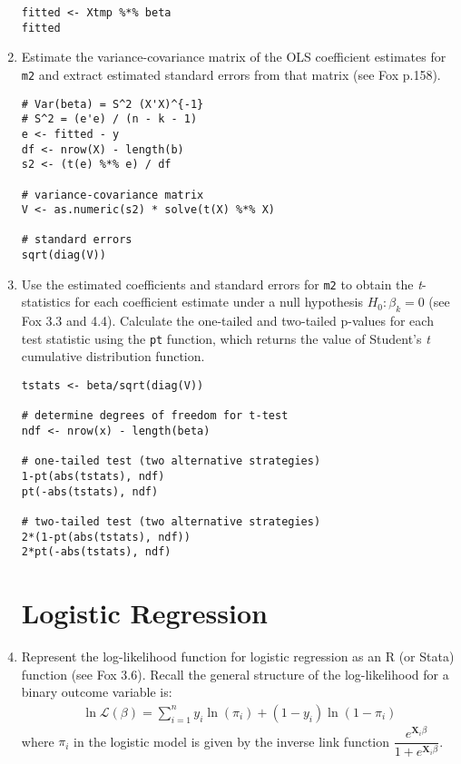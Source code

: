 \documentclass[a4paper,12pt]{article}
\newcommand{\matr}[1]{\mathbf{#1}}
\newcommand{\lik}{\mathcal{L}}
\begin{document}
\begin{enumerate}
\begin{solution}
\begin{lstlisting}
fitted <- Xtmp %*% beta
fitted
\end{lstlisting}
\end{solution}

\item Estimate the variance-covariance matrix of the OLS coefficient estimates for \texttt{m2} and extract estimated standard errors from that matrix (see Fox p.158).

\begin{solution}
\begin{lstlisting}
# Var(beta) = S^2 (X'X)^{-1}
# S^2 = (e'e) / (n - k - 1)
e <- fitted - y
df <- nrow(X) - length(b)
s2 <- (t(e) %*% e) / df

# variance-covariance matrix
V <- as.numeric(s2) * solve(t(X) %*% X)

# standard errors
sqrt(diag(V))
\end{lstlisting}
\end{solution}

\item Use the estimated coefficients and standard errors for \texttt{m2} to obtain the \textit{t}-statistics for each coefficient estimate under a null hypothesis $H_0: \beta_k = 0$ (see Fox 3.3 and 4.4). Calculate the one-tailed and two-tailed p-values for each test statistic using the \texttt{pt} function, which returns the value of Student's \textit{t} cumulative distribution function.

\begin{solution}
\begin{lstlisting}
tstats <- beta/sqrt(diag(V))

# determine degrees of freedom for t-test
ndf <- nrow(x) - length(beta)

# one-tailed test (two alternative strategies)
1-pt(abs(tstats), ndf)
pt(-abs(tstats), ndf)

# two-tailed test (two alternative strategies)
2*(1-pt(abs(tstats), ndf))
2*pt(-abs(tstats), ndf)
\end{lstlisting}
\end{solution}


\clearpage
\section*{Logistic Regression}

\item Represent the log-likelihood function for logistic regression as an R (or Stata) function (see Fox 3.6). Recall the general structure of the log-likelihood for a binary outcome variable is: 
\begin{align*}
\ln\lik(\beta) = \sum_{i=1}^{n} y_i \ln(\pi_i) + (1-y_i) \ln(1-\pi_i)
\end{align*}
where $\pi_i$ in the logistic model is given by the inverse link function $\dfrac{e^{\matr{X}_i\beta}}{1 + e^{\matr{X}_i\beta}}$.


\end{enumerate}
\end{document}
